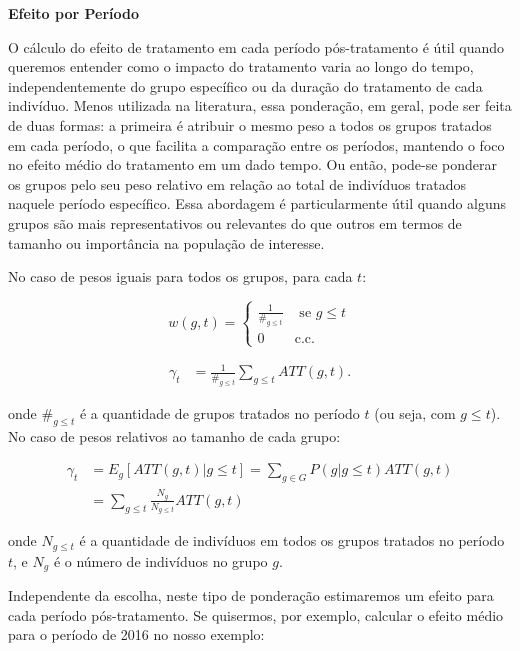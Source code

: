 \documentclass[portugues]{article}
\begin{document}
\vspace{3mm}

\textbf{Efeito por Período}

\vspace{2mm}

O cálculo do efeito de tratamento em cada período pós-tratamento é útil quando queremos entender como o impacto do tratamento varia ao longo do tempo, independentemente do grupo específico ou da duração do tratamento de cada indivíduo. Menos utilizada na literatura, essa ponderação, em geral, pode ser feita de duas formas: a primeira é atribuir o mesmo peso a todos os grupos tratados em cada período, o que facilita a comparação entre os períodos, mantendo o foco no efeito médio do tratamento em um dado tempo. Ou então, pode-se ponderar os grupos pelo seu peso relativo em relação ao total de indivíduos tratados naquele período específico. Essa abordagem é particularmente útil quando alguns grupos são mais representativos ou relevantes do que outros em termos de tamanho ou importância na população de interesse.

No caso de pesos iguais para todos os grupos, para cada $t$:

$$ w(g,t) = \begin{cases} \frac{1}{\#_{g \leq t}} & \text{ se } g \leq t \\ 0 & \text{c.c. } \end{cases} $$

\[
\begin{split}
    \gamma_t &= \frac{1}{\#_{g \leq t}} \sum_{g \leq t} ATT(g,t). 
\end{split}
\]

\noindent onde $\#_{g \leq t}$ é a quantidade de grupos tratados no período $t$ (ou seja, com $g \leq t$). No caso de pesos relativos ao tamanho de cada grupo:

\[
\begin{split}
    \gamma_t &= E_g[ATT(g,t) | g \leq t] = \sum_{g \in G} P(g | g \leq t) ATT(g,t) \\
    &= \sum_{g \leq t} \frac{N_g}{N_{g \leq t}} ATT(g,t)
\end{split}
\]

\noindent onde $N_{g \leq t}$ é a quantidade de indivíduos em todos os grupos tratados no período $t$, e $N_g$ é o número de indivíduos no grupo $g$.

Independente da escolha, neste tipo de ponderação estimaremos um efeito para cada período pós-tratamento. Se quisermos, por exemplo, calcular o efeito médio para o período de 2016 no nosso exemplo: 
\end{document}
